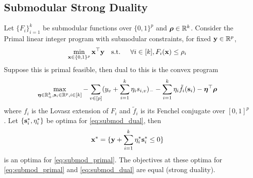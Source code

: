 \subsection{Submodular Strong Duality}

\begin{lemma}
\label{lem:submod_convex}
Let $\{F_i\}_{i = 1}^k$ be submodular functions over $\{0,1\}^p$ and $\bm{\rho} \in \mathbb{R}^k$.
Consider the Primal linear integer program with submodular constraints, for fixed $\mathbf{y} \in \mathbb{R}^p$,
\begin{equation}
\label{eq:submod_primal}
\min_{\mathbf{x} \in \{0,1\}^p}  \mathbf{x}^\top \mathbf{y} \textrm{\quad s.t. \quad} \forall i \in [k], F_i(\mathbf{x}) \le \rho_i
\end{equation}
Suppose this is primal feasible,
then dual to this is the convex program
\begin{equation}
\label{eq:submod_dual}
\max_{\bm{\eta} \in \mathbb{R}_+^k, \mathbf{s}_i \in \mathbb{R}^p, i \in [k]}  - \sum_{v \in [p]} (y_v + \sum_{i=1}^k \eta_i s_{i,v})_- - \sum_{i = 1}^k \eta_i \tilde f_i (\mathbf{s}_i) - \bm{\eta}^\top \bm{\rho}
\end{equation}
where $f_i$ is the Lovasz extension of $F_i$ and $\tilde f_i$ is its Fenchel conjugate over $[0,1]^p$.
Let $\{\mathbf{s}_i^*,\eta_i^*\}$ be optima for \eqref{eq:submod_dual}, then 
\[
\mathbf{x}^* = \{\mathbf{y} + \sum_{i=1}^k \eta^*_i \mathbf{s}^*_i \le 0\}
\]
is an optima for \eqref{eq:submod_primal}.
The objectives at these optima for \eqref{eq:submod_primal} and \eqref{eq:submod_dual} are equal (strong duality).
\end{lemma}

